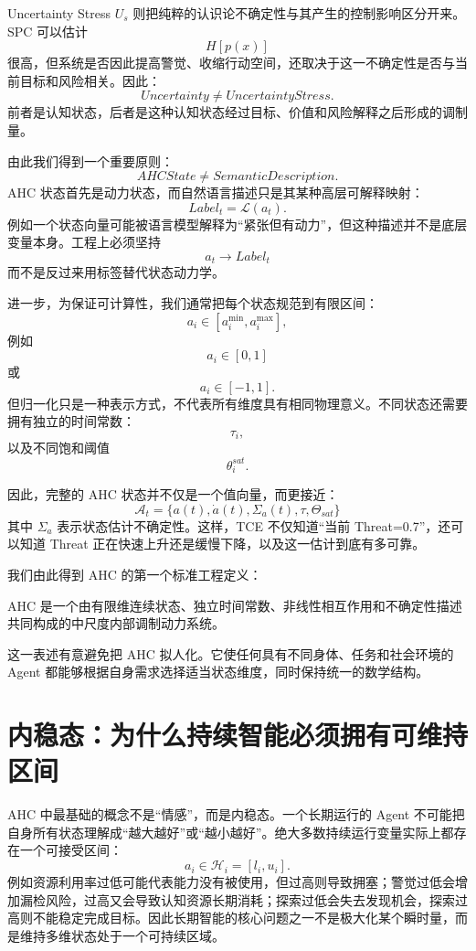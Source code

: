 Uncertainty Stress \(U_s\) 则把纯粹的认识论不确定性与其产生的控制影响区分开来。SPC 可以估计
\[
H[p(x)]
\]
很高，但系统是否因此提高警觉、收缩行动空间，还取决于这一不确定性是否与当前目标和风险相关。因此：
\[
Uncertainty
\neq
UncertaintyStress.
\]
前者是认知状态，后者是这种认知状态经过目标、价值和风险解释之后形成的调制量。

由此我们得到一个重要原则：
\[
\boxed{
AHCState
\neq
SemanticDescription.
}
\]
AHC 状态首先是动力状态，而自然语言描述只是其某种高层可解释映射：
\[
Label_t
=
\mathcal L(a_t).
\]
例如一个状态向量可能被语言模型解释为“紧张但有动力”，但这种描述并不是底层变量本身。工程上必须坚持
\[
a_t \rightarrow Label_t
\]
而不是反过来用标签替代状态动力学。

进一步，为保证可计算性，我们通常把每个状态规范到有限区间：
\[
a_i\in[a_i^{\min},a_i^{\max}],
\]
例如
\[
a_i\in[0,1]
\]
或
\[
a_i\in[-1,1].
\]
但归一化只是一种表示方式，不代表所有维度具有相同物理意义。不同状态还需要拥有独立的时间常数：
\[
\tau_i,
\]
以及不同饱和阈值
\[
\theta_i^{sat}.
\]

因此，完整的 AHC 状态并不仅是一个值向量，而更接近：
\[
\boxed{
\mathcal A_t
=
\{
a(t),
\dot a(t),
\Sigma_a(t),
\tau,
\Theta_{sat}
\}
}
\]
其中 \(\Sigma_a\) 表示状态估计不确定性。这样，TCE 不仅知道“当前 Threat=0.7”，还可以知道 Threat 正在快速上升还是缓慢下降，以及这一估计到底有多可靠。

我们由此得到 AHC 的第一个标准工程定义：

\begin{definition*}
AHC 是一个由有限维连续状态、独立时间常数、非线性相互作用和不确定性描述共同构成的中尺度内部调制动力系统。
\end{definition*}

这一表述有意避免把 AHC 拟人化。它使任何具有不同身体、任务和社会环境的 Agent 都能够根据自身需求选择适当状态维度，同时保持统一的数学结构。

\section{内稳态：为什么持续智能必须拥有可维持区间}

AHC 中最基础的概念不是“情感”，而是内稳态。一个长期运行的 Agent 不可能把自身所有状态理解成“越大越好”或“越小越好”。绝大多数持续运行变量实际上都存在一个可接受区间：
\[
a_i
\in
\mathcal H_i
=
[l_i,u_i].
\]
例如资源利用率过低可能代表能力没有被使用，但过高则导致拥塞；警觉过低会增加漏检风险，过高又会导致认知资源长期消耗；探索过低会失去发现机会，探索过高则不能稳定完成目标。因此长期智能的核心问题之一不是极大化某个瞬时量，而是维持多维状态处于一个可持续区域。

